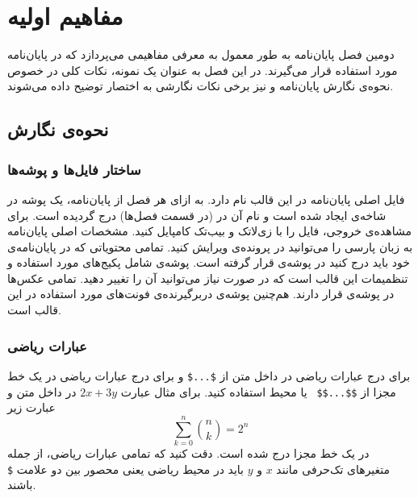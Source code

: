 
\chapter{مفاهیم اولیه}
دومین فصل پایان‌نامه به طور معمول به معرفی مفاهیمی می‌پردازد که در پایان‌نامه مورد استفاده قرار می‌گیرند. در این فصل به عنوان یک نمونه، نکات کلی در خصوص نحوه‌ی نگارش پایان‌نامه و نیز برخی نکات نگارشی به اختصار توضیح داده می‌شوند.


\section{نحوه‌ی نگارش}
\subsection{ساختار فایل‌ها و پوشه‌ها}
فایل‌ اصلی پایان‌نامه در این قالب  نام دارد. به ازای هر فصل از پایان‌نامه، یک پوشه در شاخه‌ی  ایجاد شده است و نام آن در   (در قسمت فصل‌ها) درج گردیده است. برای مشاهده‌ی خروجی، فایل  را با زی‌لاتک و بیب‌تک کامپایل کنید. مشخصات اصلی پایان‌نامه به زبان پارسی را می‌توانید در پرونده‌ی  ویرایش کنید. تمامی محتویاتی که در پایان‌نامه‌‌ی خود باید درج کنید در پوشه‌ی  قرار گرفته است. پوشه‌ی  شامل پکیج‌های مورد استفاده و تنظمیمات این قالب است که در صورت نیاز می‌توانید آن را تغییر دهید. تمامی عکس‌ها در پوشه‌ی  قرار دارند. هم‌چنین پوشه‌ی  دربرگیرنده‌ی فونت‌های مورد استفاده در این قالب است.


\subsection{عبارات ریاضی}
برای درج عبارات ریاضی در داخل متن از \texttt{\$...\$} و برای درج عبارات ریاضی در یک خط مجزا از \texttt{\$\$...\$\$ } یا محیط  استفاده کنید. برای مثال عبارت $2x + 3y$ در داخل متن و عبارت زیر
\begin{equation}
\sum_{k=0}^{n} \binom{n}{k} = 2^n
\end{equation}
در یک خط مجزا درج شده است. دقت کنید که تمامی عبارات ریاضی، از جمله متغیرهای تک‌حرفی مانند $x$ و $y$ باید در محیط ریاضی یعنی محصور بین دو علامت \texttt{\$} باشند. 


